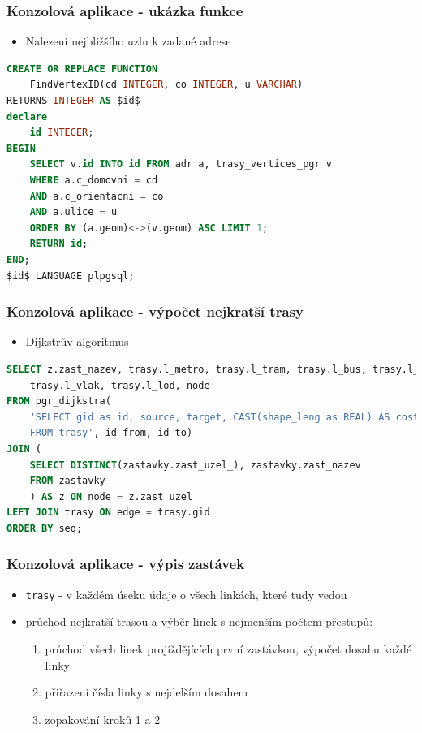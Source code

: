 \documentclass{beamer}
\begin{document}
\begin{frame}[fragile]
\frametitle{Konzolová aplikace - ukázka funkce}
\begin{itemize}
	\item Nalezení nejbližšího uzlu k zadané adrese
\end{itemize}
\begin{exampleblock}{}
\begin{lstlisting}[columns=flexible, basicstyle=\footnotesize, language=sql]
CREATE OR REPLACE FUNCTION 
	FindVertexID(cd INTEGER, co INTEGER, u VARCHAR)
RETURNS INTEGER AS $id$
declare 
	id INTEGER;
BEGIN 
	SELECT v.id INTO id FROM adr a, trasy_vertices_pgr v 
	WHERE a.c_domovni = cd 
	AND a.c_orientacni = co 
	AND a.ulice = u
	ORDER BY (a.geom)<->(v.geom) ASC LIMIT 1;
	RETURN id;
END;
$id$ LANGUAGE plpgsql;
\end{lstlisting}
\end{exampleblock}
\end{frame}


\begin{frame}[fragile]
\frametitle{Konzolová aplikace - výpočet nejkratší trasy}
\begin{itemize}
	\item Dijkstrův algoritmus
\end{itemize}
\begin{exampleblock}{}
\begin{lstlisting}[showstringspaces=false, columns=flexible, basicstyle=\footnotesize, language=sql]
SELECT z.zast_nazev, trasy.l_metro, trasy.l_tram, trasy.l_bus, trasy.l_lan, 
	trasy.l_vlak, trasy.l_lod, node
FROM pgr_dijkstra(
	'SELECT gid as id, source, target, CAST(shape_leng as REAL) AS cost 
	FROM trasy', id_from, id_to) 
JOIN (
	SELECT DISTINCT(zastavky.zast_uzel_), zastavky.zast_nazev 
	FROM zastavky
	) AS z ON node = z.zast_uzel_ 
LEFT JOIN trasy ON edge = trasy.gid 
ORDER BY seq;
\end{lstlisting}
\end{exampleblock}
\end{frame}

\begin{frame}
\frametitle{Konzolová aplikace - výpis zastávek}
\begin{itemize}
	\item \texttt{trasy} - v každém úseku údaje o všech linkách, které tudy vedou
	\item průchod nejkratší trasou a výběr linek s nejmenším počtem přestupů: 
	\begin{enumerate}
		\item průchod všech linek projíždějících první zastávkou, výpočet dosahu každé linky
	\item přiřazení čísla linky s nejdelším dosahem
	\item zopakování kroků 1 a 2
	\end{enumerate}
\end{itemize}
\end{frame}
\end{document}
